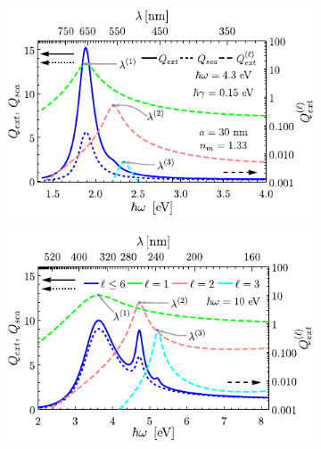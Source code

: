 	\begin{figure}[h!]\centering\hspace*{-1.5em}
	\begin{subfigure}{.01\linewidth}\caption{}\label{sfig:Qext4-30}\vspace{3.75cm}\end{subfigure}
	\begin{subfigure}{.45\linewidth}\hspace*{-1.3em}
	\includegraphics[scale=1]{1-Teoria/figs/1-5-Drude4-ExtSca_30.pdf}
	\end{subfigure}
	\begin{subfigure}{.01\linewidth}\caption{}\label{sfig:Qext10-30}\vspace{3.75cm}\end{subfigure}
	\begin{subfigure}{.45\linewidth}\hspace*{-1em}
	\includegraphics[scale=1]{1-Teoria/figs/1-5-Drude10-ExtSca_30.pdf}
	\end{subfigure}\vspace*{-.7em}

\end{figure}
